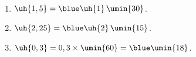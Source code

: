    \ \\ [-5mm]
   \begin{enumerate}
      \item $\uh{1,5} =\blue \uh{1}\,\umin{30}$.
      \item $\uh{2,25} =\blue \uh{2}\,\umin{15}$.
      \item $\uh{0,3} =0,3\times\umin{60} =\blue \umin{18}$.
   \end{enumerate}
